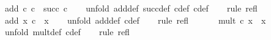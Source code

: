 \begin{isabellebody}
\isanewline
{}\isamarkupfalse%
\ {\isachardoublequoteopen}add\ c{\isacharunderscore}{\kern0pt}{}\ c{\isacharunderscore}{\kern0pt}{}\ {\isacharequal}{\kern0pt}\ succ\ c{\isacharunderscore}{\kern0pt}{}{\isachardoublequoteclose}\isanewline
%
\isadelimproof
\ \ %
\endisadelimproof
%
\isatagproof
{}\isamarkupfalse%
\ {\isacharparenleft}{\kern0pt}unfold\ add{\isacharunderscore}{\kern0pt}def\ succ{\isacharunderscore}{\kern0pt}def\ c{\isacharunderscore}{\kern0pt}{}{\isacharunderscore}{\kern0pt}def\ c{\isacharunderscore}{\kern0pt}{}{\isacharunderscore}{\kern0pt}def{\isacharparenright}{\kern0pt}\isanewline
\ \ \isamarkupfalse%
\ {\isacharparenleft}{\kern0pt}rule\ refl{\isacharparenright}{\kern0pt}\isanewline
\ \ \isamarkupfalse%
%
\endisatagproof
{\isafoldproof}%
%
\isadelimproof
\isanewline
%
\endisadelimproof
\isanewline
{}\isamarkupfalse%
\ {\isachardoublequoteopen}add\ x\ c{\isacharunderscore}{\kern0pt}{}\ {\isacharequal}{\kern0pt}\ x{\isachardoublequoteclose}\isanewline
%
\isadelimproof
\ \ %
\endisadelimproof
%
\isatagproof
{}\isamarkupfalse%
\ {\isacharparenleft}{\kern0pt}unfold\ add{\isacharunderscore}{\kern0pt}def\ c{\isacharunderscore}{\kern0pt}{}{\isacharunderscore}{\kern0pt}def{\isacharparenright}{\kern0pt}\isanewline
\ \ \isamarkupfalse%
\ {\isacharparenleft}{\kern0pt}rule\ refl{\isacharparenright}{\kern0pt}\isanewline
\ \ \isamarkupfalse%
%
\endisatagproof
{\isafoldproof}%
%
\isadelimproof
\isanewline
%
\endisadelimproof
\ \ \isanewline
{}\isamarkupfalse%
\ {\isachardoublequoteopen}mult\ c{\isacharunderscore}{\kern0pt}{}\ x\ {\isacharequal}{\kern0pt}\ x{\isachardoublequoteclose}\isanewline
%
\isadelimproof
\ \ %
\endisadelimproof
%
\isatagproof
{}\isamarkupfalse%
\ {\isacharparenleft}{\kern0pt}unfold\ mult{\isacharunderscore}{\kern0pt}def\ c{\isacharunderscore}{\kern0pt}{}{\isacharunderscore}{\kern0pt}def{\isacharparenright}{\kern0pt}\isanewline
\ \ \isamarkupfalse%
\ {\isacharparenleft}{\kern0pt}rule\ refl{\isacharparenright}{\kern0pt}\isanewline
\ \ \isamarkupfalse%
%
\endisatagproof
{\isafoldproof}%
%
\isadelimproof
%
\endisadelimproof
%
\isadelimdocument
%
\endisadelimdocument
%
\isatagdocument
%
\isamarkuptrue%
%
\endisatagdocument
{\isafolddocument}%
%
\isadelimdocument

\end{isabellebody}
